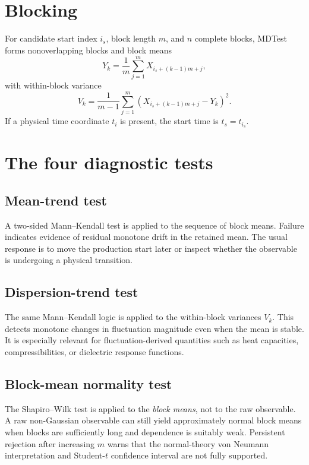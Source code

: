 \documentclass[11pt,oneside]{report}
\newcommand{\is}{i_s}
\newcommand{\ts}{t_s}
\begin{document}
\section{Blocking}
For candidate start index $\is$, block length $m$, and $n$ complete blocks, MDTest forms nonoverlapping blocks and block means
\begin{equation}
Y_k=\frac{1}{m}\sum_{j=1}^m X_{\is+(k-1)m+j},
\end{equation}
with within-block variance
\begin{equation}
V_k=\frac{1}{m-1}\sum_{j=1}^m\left(X_{\is+(k-1)m+j}-Y_k\right)^2.
\end{equation}
If a physical time coordinate $t_i$ is present, the start time is $\ts=t_{\is}$.

\section{The four diagnostic tests}
\subsection{Mean-trend test}
A two-sided Mann--Kendall test is applied to the sequence of block means. Failure indicates evidence of residual monotone drift in the retained mean. The usual response is to move the production start later or inspect whether the observable is undergoing a physical transition.

\subsection{Dispersion-trend test}
The same Mann--Kendall logic is applied to the within-block variances $V_k$. This detects monotone changes in fluctuation magnitude even when the mean is stable. It is especially relevant for fluctuation-derived quantities such as heat capacities, compressibilities, or dielectric response functions.

\subsection{Block-mean normality test}
The Shapiro--Wilk test is applied to the \emph{block means}, not to the raw observable. A raw non-Gaussian observable can still yield approximately normal block means when blocks are sufficiently long and dependence is suitably weak. Persistent rejection after increasing $m$ warns that the normal-theory von Neumann interpretation and Student-$t$ confidence interval are not fully supported.
\end{document}
